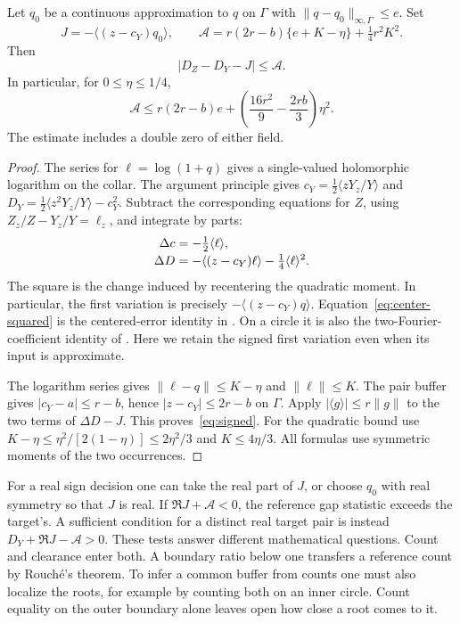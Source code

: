 \begin{theorem}\label{th:signed}
Let \(q_0\) be a continuous approximation to \(q\) on \(\Gamma\) with \(\|q-q_0\|_{\infty,\Gamma}\le e\). Set
\[
 J=-\langle(z-c_Y)q_0\rangle,\qquad
 \mathcal A=r(2r-b)\{e+K-\eta\}+\tfrac14 r^2K^2 .
\]
Then
\begin{equation}
 |D_Z-D_Y-J|\le\mathcal A . \label{eq:signed}
\end{equation}
In particular, for \(0\le\eta\le1/4\),
\begin{equation}
 \mathcal A\le r(2r-b)e+
          \left(\frac{16r^2}{9}-\frac{2rb}{3}\right)\eta^2 .
 \label{eq:signed-small}
\end{equation}
The estimate includes a double zero of either field.
\end{theorem}
\begin{proof}
The series for \(\ell=\log(1+q)\) gives a single-valued holomorphic logarithm on the collar. The argument principle gives \(c_Y=\tfrac12\langle zY_z/Y\rangle\) and \(D_Y=\tfrac12\langle z^2Y_z/Y\rangle-c_Y^2\). Subtract the corresponding equations for \(Z\), using \(Z_z/Z-Y_z/Y=\ell_z\), and integrate by parts:
\begin{align}
 \Delta c&=-\tfrac12\langle\ell\rangle,\notag\\[-2pt]
 \Delta D&=-\langle(z-c_Y)\ell\rangle-\tfrac14\langle\ell\rangle^2 .
 \label{eq:center-squared}
\end{align}
The square is the change induced by recentering the quadratic moment. In particular, the first variation is precisely \(-\langle(z-c_Y)q\rangle\). Equation~\eqref{eq:center-squared} is the centered-error identity in \cite[(7.2)]{agc}. On a circle it is also the two-Fourier-coefficient identity of \cite[(8.15)]{agc}. Here we retain the signed first variation even when its input is approximate.

The logarithm series gives \(\|\ell-q\|\le K-\eta\) and \(\|\ell\|\le K\). The pair buffer gives \(|c_Y-a|\le r-b\), hence \(|z-c_Y|\le2r-b\) on \(\Gamma\). Apply \(|\langle g\rangle|\le r\|g\|\) to the two terms of \(\Delta D-J\). This proves~\eqref{eq:signed}. For the quadratic bound use
\(K-\eta\le\eta^2/[2(1-\eta)]\le 2\eta^2/3\) and \(K\le4\eta/3\). All formulas use symmetric moments of the two occurrences.
\end{proof}

For a real sign decision one can take the real part of \(J\), or choose \(q_0\) with real symmetry so that \(J\) is real. If \(\Re J+\mathcal A<0\), the reference gap statistic exceeds the target's. A sufficient condition for a distinct real target pair is instead \(D_Y+\Re J-\mathcal A>0\). These tests answer different mathematical questions. Count and clearance enter both. A boundary ratio below one transfers a reference count by Rouché's theorem. To infer a common buffer from counts one must also localize the roots, for example by counting both on an inner circle. Count equality on the outer boundary alone leaves open how close a root comes to it.

